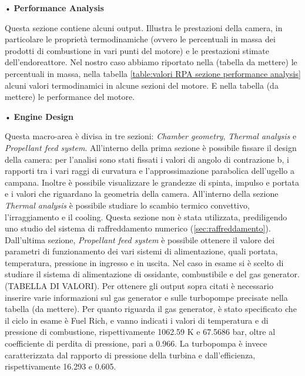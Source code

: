 • \textbf{Performance Analysis}

Questa sezione contiene alcuni output. Illustra le prestazioni della camera, in particolare le proprietà termodinamiche (ovvero le percentuali in massa dei prodotti di combustione in vari punti del motore) e le prestazioni stimate dell'endoreattore. Nel nostro caso abbiamo riportato nella (tabella da mettere) le percentuali in massa, nella tabella \autoref{table:valori RPA sezione performance analysis} alcuni valori termodinamici in alcune sezioni del motore. E nella tabella (da mettere) le performance del motore.

• \textbf{Engine Design}

Questa macro-area è divisa in tre sezioni: \textit{Chamber geometry}, \textit{Thermal analysis} e \textit{Propellant feed system}.
All'interno della prima sezione è possibile fissare il design della camera: per l'analisi sono stati fissati i valori di angolo di contrazione b, i rapporti tra i vari raggi di curvatura e l'approssimazione parabolica dell'ugello a campana. Inoltre è possibile visualizzare le grandezze di spinta, impulso e portata e i valori che riguardano la geometria della camera.
All'interno della sezione \textit{Thermal analysis} è possibile studiare lo scambio termico convettivo, l'irraggiamento e il cooling. Questa sezione non è stata utilizzata, prediligendo uno studio del sistema di raffreddamento numerico (\autoref{sec:raffreddamento}).
Dall'ultima sezione, \textit{Propellant feed system} è possibile ottenere il valore dei parametri di funzionamento dei vari sistemi di alimentazione, quali portata, temperatura, pressione in ingresso e in uscita. Nel caso in esame si è scelto di studiare il sistema di alimentazione di ossidante, combustibile e del gas generator. (TABELLA DI VALORI). Per ottenere gli output sopra citati è necessario inserire varie informazioni sul gas generator e sulle turbopompe precisate nella tabella (da mettere). Per quanto riguarda il gas generator, è stato specificato che il ciclo in esame è Fuel Rich, e vanno indicati i valori di temperatura e di pressione di combustione, rispettivamente 1062.59 K e 67.5686 bar, oltre al coefficiente di perdita di pressione, pari a 0.966. La turbopompa è invece caratterizzata dal rapporto di pressione della turbina e dall'efficienza, rispettivamente 16.293 e 0.605. 


